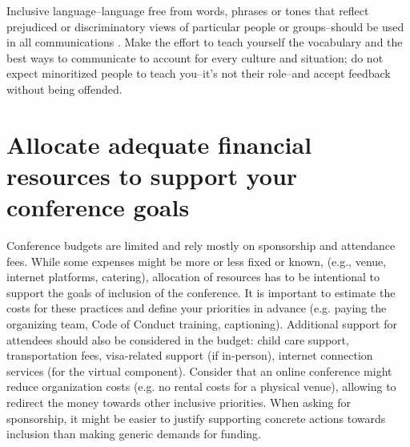 \documentclass[10pt,letterpaper]{article}
\begin{document}
Inclusive language--language free from words, phrases or tones that reflect prejudiced or discriminatory views of particular people or groups--should be used in all communications \cite{hallDesigningDiversityInclusion2019}.
Make the effort to teach yourself the vocabulary %
and the best ways to communicate to account for every culture and situation; do not expect minoritized people to teach you--it's not their role--and accept feedback without being offended.




\section{Allocate adequate financial resources to support your conference goals}
\label{rule_financial}

Conference budgets are limited and rely mostly on sponsorship and attendance fees. 
While some expenses might be more or less fixed or known, (e.g., venue, internet platforms, catering), allocation of resources has to be intentional to support the goals of inclusion of the conference. 
It is important to estimate the costs for these practices and define your priorities in advance (e.g. paying the organizing team, Code of Conduct training, captioning).
Additional support for attendees should also be considered in the budget: child care support, transportation fees, visa-related support (if in-person), internet connection services (for the virtual component). 
Consider that an online conference might reduce organization costs (e.g. no rental costs for a physical venue), allowing to redirect the money towards other inclusive priorities. 
When asking for sponsorship, it might be easier to justify supporting concrete actions towards inclusion than making generic demands for funding.
\end{document}
